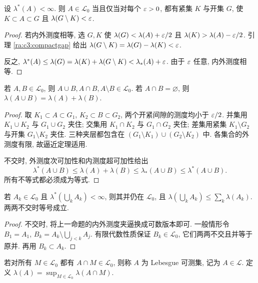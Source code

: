 \begin{theorem}[有限测度的逼近]\label{ra:c3:finiteapprox}
设 $\lambda^*(A)<\infty$. 则 $A\in\mathcal L_0$ 当且仅当对每个 $\varepsilon>0$, 都有紧集 $K$ 与开集 $G$, 使 $K\subset A\subset G$ 且 $\lambda(G\setminus K)<\varepsilon$.
\end{theorem}
\begin{proof}
若内外测度相等, 选 $G,K$ 使 $\lambda(G)<\lambda(A)+\varepsilon/2$ 且 $\lambda(K)>\lambda(A)-\varepsilon/2$. 引理 \ref{ra:c3:compactgap} 给出 $\lambda(G\setminus K)=\lambda(G)-\lambda(K)<\varepsilon$.

反之, $\lambda^*(A)\le\lambda(G)=\lambda(K)+\lambda(G\setminus K)<\lambda_*(A)+\varepsilon$. 由于 $\varepsilon$ 任意, 内外测度相等.
\end{proof}

\begin{proposition}\label{ra:c3:finitealgebra}
若 $A,B\in\mathcal L_0$, 则 $A\cup B,A\cap B,A\setminus B\in\mathcal L_0$. 若 $A\cap B=\varnothing$, 则 $\lambda(A\cup B)=\lambda(A)+\lambda(B)$.
\end{proposition}
\begin{proof}
取 $K_1\subset A\subset G_1$, $K_2\subset B\subset G_2$, 两个开紧间隙的测度均小于 $\varepsilon/2$. 并集用 $K_1\cup K_2$ 与 $G_1\cup G_2$ 夹住; 交集用 $K_1\cap K_2$ 与 $G_1\cap G_2$ 夹住; 差集用紧集 $K_1\setminus G_2$ 与开集 $G_1\setminus K_2$ 夹住. 三种夹层都包含在 $(G_1\setminus K_1)\cup(G_2\setminus K_2)$ 中. 各集合的外测度有限, 故逼近定理适用.

不交时, 外测度次可加性和内测度超可加性给出
\[
 \lambda^*(A\cup B)\le\lambda(A)+\lambda(B)
 \le\lambda_*(A\cup B)\le\lambda^*(A\cup B).
\]
所有不等式都必须成为等式.
\end{proof}

\begin{proposition}\label{ra:c3:finitecountable}
若 $A_k\in\mathcal L_0$ 且 $\lambda^*(\bigcup_kA_k)<\infty$, 则其并仍在 $\mathcal L_0$, 且 $\lambda(\bigcup_kA_k)\le\sum_k\lambda(A_k)$. 两两不交时等号成立.
\end{proposition}
\begin{proof}
不交时, 将上一命题的内外测度夹逼换成可数版本即可. 一般情形令 $B_1=A_1$, $B_k=A_k\setminus\bigcup_{j<k}A_j$. 有限代数性质保证 $B_k\in\mathcal L_0$, 它们两两不交且并等于原并. 再用 $B_k\subset A_k$.
\end{proof}


\begin{definition}\label{ra:c3:allmeasurable}
若对所有 $M\in\mathcal L_0$ 都有 $A\cap M\in\mathcal L_0$, 则称 $A$ 为 Lebesgue 可测集, 记为 $A\in\mathcal L$. 定义 $\lambda(A)=\sup_{M\in\mathcal L_0}\lambda(A\cap M)$.
\end{definition}

